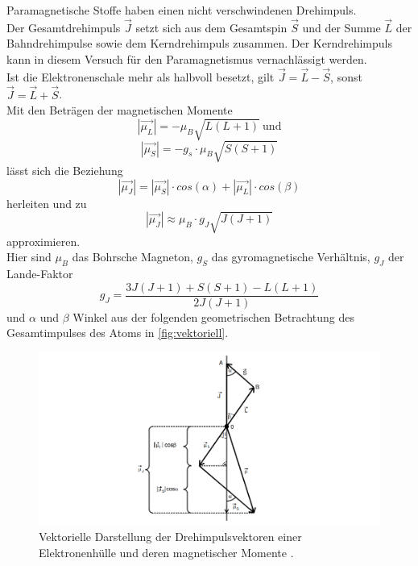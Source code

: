 Paramagnetische Stoffe haben einen nicht verschwindenen Drehimpuls.\\
Der Gesamtdrehimpuls $\vec{J}$ setzt sich aus dem Gesamtspin $\vec{S}$ und der Summe $\vec{L}$ der Bahndrehimpulse sowie dem Kerndrehimpuls zusammen. Der Kerndrehimpuls kann in diesem Versuch für den Paramagnetismus vernachlässigt werden.\\
Ist die Elektronenschale mehr als halbvoll besetzt, gilt $\vec{J} = \vec{L} - \vec{S}$, sonst $\vec{J} = \vec{L} + \vec{S}$.\\

Mit den Beträgen der magnetischen Momente 
\begin{equation*}
    |\vec{\mu_L}| = -\mu_B \sqrt{L(L+1)}\ \textrm{und}
\end{equation*}
\begin{equation*}
    |\vec{\mu_S}| = - g_s \cdot \mu_B \sqrt{S(S+1)}
\end{equation*}
lässt sich die Beziehung 
\begin{equation*}
    |\vec{\mu_J}| = |\vec{\mu_S}| \cdot cos(\alpha) + |\vec{\mu_L}| \cdot cos(\beta)
\end{equation*}
herleiten und zu 
\begin{equation*}
    |\vec{\mu_J}| \approx \mu_B \cdot g_J \sqrt{J(J+1)}
\end{equation*}
approximieren.\\
Hier sind $\mu_B$ das Bohrsche Magneton, $g_S$ das gyromagnetische 
Verhältnis, $g_J$ der Lande-Faktor
\begin{equation}
    g_J = \frac{3J(J+1) + S(S+1) - L(L+1)}{2J(J+1)}
    \label{eq:gyromyro}
\end{equation}
und $\alpha$ und $\beta$ Winkel aus der folgenden geometrischen Betrachtung des Gesamtimpulses
des Atoms in \autoref{fig:vektoriell}.\\
\begin{figure}
    \centering
    \includegraphics[width=\textwidth]{content/vec_theo.png}
    \caption{Vektorielle Darstellung der Drehimpulsvektoren einer Elektronenhülle und deren magnetischer Momente \cite{sample}.}
    \label{fig:vektoriell}
\end{figure}

